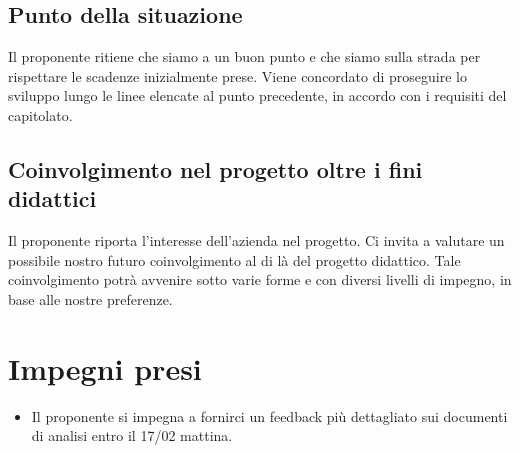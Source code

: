 \documentclass[a4paper, 12pt]{article}
\begin{document}
\subsection{Punto della situazione}
Il proponente ritiene che siamo a un buon punto e che siamo sulla strada per rispettare le scadenze inizialmente prese.
Viene concordato di proseguire lo sviluppo lungo le linee elencate al punto precedente, in accordo con i requisiti del capitolato.

\subsection{Coinvolgimento nel progetto oltre i fini didattici}
Il proponente riporta l'interesse dell'azienda nel progetto. Ci invita a valutare un possibile nostro futuro coinvolgimento al di là del progetto didattico. Tale coinvolgimento potrà avvenire sotto varie forme e con diversi livelli di impegno, in base alle nostre preferenze.


\section{Impegni presi}
\begin{itemize}
\item Il proponente si impegna a fornirci un feedback più dettagliato sui documenti di analisi entro il 17/02 mattina.
\end{itemize}
\end{document}
